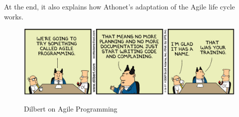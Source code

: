 At the end, it also explains how Athonet's adaptation of the Agile life cycle works.
\begin{figure}[H]
	\centering
	\includegraphics[width=\textwidth]{resources/Dilbert_Training_Agile_Programming}\\
	\caption{Dilbert on Agile Programming}
\end{figure}

